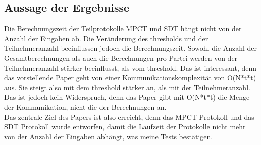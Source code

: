 \subsection{Aussage der Ergebnisse}
Die Berechnungszeit der Teilprotokolle MPCT und SDT hängt nicht von der Anzahl der Eingaben ab. Die Veränderung des thresholds und der Teilnehmeranzahl beeinflussen jedoch die Berechnungszeit. Sowohl die Anzahl der Gesamtberechnungen als auch die Berechnungen pro Partei werden von der Teilnehmeranzahl stärker beeinflusst, als vom threshold.
Das ist interessant, denn das vorstellende Paper \cite{Doettling2021} geht von einer Kommunikationskomplexität von O(N*t*t) aus. Sie steigt also mit dem threshold stärker an, als mit der Teilnehmeranzahl. Das ist jedoch kein Widerspruch, denn das Paper gibt mit O(N*t*t) die Menge der Kommunikation, nicht die der Berechnungen an.\\
Das zentrale Ziel des Papers \cite{Doettling2021} ist also erreicht, denn das MPCT Protokoll und das SDT Protokoll wurde entworfen, damit die Laufzeit der Protokolle nicht mehr von der Anzahl der Eingaben abhängt, was meine Tests bestätigen.